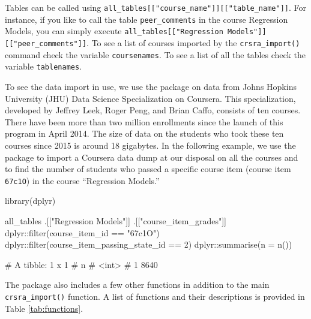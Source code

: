 Tables can be called using
\texttt{all\_tables{[}{[}"course\_name"{]}{]}{[}{[}"table\_name"{]}{]}}.
For instance, if you like to call the table \texttt{peer\_comments} in
the course Regression Models, you can simply execute
\texttt{all\_tables{[}{[}"Regression\ Models"{]}{]}{[}{[}"peer\_comments"{]}{]}}.
To see a list of courses imported by the \texttt{crsra\_import()}
command check the variable \texttt{coursenames}. To see a list of all
the tables check the variable \texttt{tablenames}.

To see the data import in use, we use the package on data from Johns
Hopkins University (JHU) Data Science Specialization on Coursera. This
specialization, developed by Jeffrey Leek, Roger Peng, and Brian Caffo,
consists of ten courses. There have been more than two million
enrollments since the launch of this program in April 2014. The size of
data on the students who took these ten courses since 2015 is around 18
gigabytes. In the following example, we use the  package to
import a Coursera data dump at our disposal on all the courses and to
find the number of students who passed a specific course item (course
item \texttt{67c1O}) in the course ``Regression Models.''

\begin{Schunk}
\begin{Sinput}
library(dplyr)

all_tables %
    .[["Regression Models"]] %
    .[["course_item_grades"]] %
    dplyr::filter(course_item_id == "67c1O") %
    dplyr::filter(course_item_passing_state_id == 2) %
    dplyr::summarise(n = n())

# A tibble: 1 x 1
#      n
#   <int>
# 1  8640
\end{Sinput}
\end{Schunk}

The package also includes a few other functions in addition to the main
\texttt{crsra\_import()} function. A list of functions and their
descriptions is provided in Table \ref{tab:functions}.

